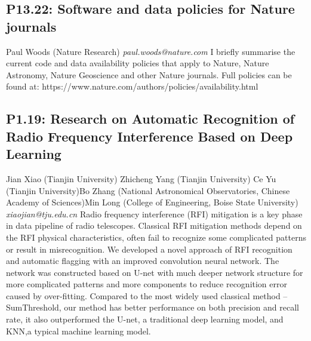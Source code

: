 \documentclass{report}
\begin{document}
\subsection*{P13.22: Software and data policies for Nature journals}
\bigskip
Paul Woods (Nature Research) \newline   \newline   \newline   \newline  \newline  \newline\newline
{\it paul.woods@nature.com}\newline
\newline\newline
I briefly summarise the current code and data availability policies that apply to Nature, Nature Astronomy, Nature Geoscience and other Nature journals. Full policies can be found at: https://www.nature.com/authors/policies/availability.html\newline
\newpage
\subsection*{P1.19: Research on Automatic Recognition of Radio Frequency Interference Based on Deep Learning}
\bigskip
Jian Xiao (Tianjin University) \newline Zhicheng Yang (Tianjin University) \newline  Ce Yu (Tianjin University)\newline  Bo Zhang (National Astronomical Observatories, Chinese Academy of Sciences)\newline Min Long (College of Engineering, Boise State University)\newline  \newline\newline
{\it xiaojian@tju.edu.cn}\newline
\newline\newline
Radio frequency interference (RFI) mitigation is a key phase in data pipeline of radio telescopes. Classical RFI mitigation methods depend on the RFI physical characteristics, often fail to recognize some complicated patterns or result in misrecognition. We developed a novel approach of RFI recognition and automatic flagging with an improved convolution neural network. The network was constructed based on U-net with much deeper network structure for more complicated patterns and more components to reduce recognition error caused by over-fitting. Compared to the most widely used classical method -- SumThreshold, our method has better performance on both precision and recall rate, it also outperformed the U-net, a traditional deep learning model, and KNN,a typical machine learning model.\newline
\newpage
\end{document}
